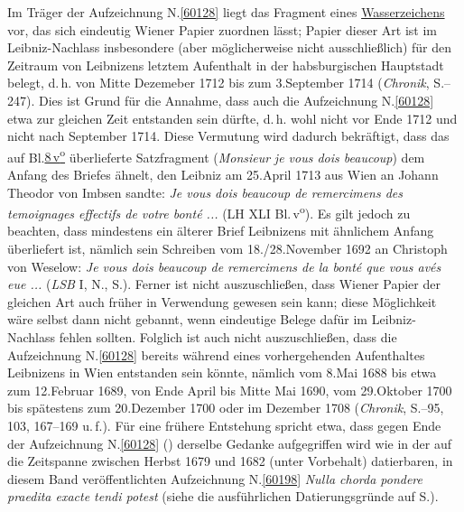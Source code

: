 \pend%
\pstart%
Im Träger der Aufzeichnung N.\;\ref{60128} liegt das Fragment eines \href{\Scan{LH_35_10_16_008wz}}{Wasserzeichens} vor, das sich eindeutig Wiener Papier zuordnen lässt;
Papier dieser Art ist im Leibniz-Nachlass insbesondere (aber möglicherweise nicht ausschließlich) für den Zeitraum von Leibnizens letztem Aufenthalt in der habsburgischen Hauptstadt belegt, d.\,h. von Mitte Dezemeber 1712 bis zum 3.\;September 1714 (\textit{Chronik}, S.--247).\cite{01236}
Dies ist Grund für die Annahme, dass auch die Aufzeichnung N.\;\ref{60128} etwa zur gleichen Zeit entstanden sein dürfte, d.\,h. wohl nicht vor Ende 1712 und nicht nach September 1714.
Diese Vermutung wird dadurch bekräftigt, dass das auf Bl.\;\href{\Scan{LH_35_10_16_008v}}{8\,v\textsuperscript{o}} überlieferte Satzfragment (\textit{Monsieur} \bracks{/} \textit{je vous dois beaucoup}) dem Anfang des Briefes ähnelt, den Leibniz am 25.\;April 1713 aus Wien an Johann Theodor von Imbsen sandte: \textit{Je vous dois beaucoup de remercimens des temoignages effectifs de votre bonté ...} (LH XLI Bl.\,v\textsuperscript{o}).\cite{02537}
\pend%
\pstart%
Es gilt jedoch zu beachten, dass mindestens ein älterer Brief Leibnizens mit ähnlichem Anfang überliefert ist, nämlich sein Schreiben vom 18./28.\;November 1692 an Christoph von Weselow: \textit{Je vous dois beaucoup de remercimens de la bonté que vous avés eue ...} (\textit{LSB} I, N., S.).\cite{02538}
Ferner ist nicht auszuschließen, dass Wiener Papier der gleichen Art auch früher in Verwendung gewesen sein kann;
diese Möglichkeit wäre selbst dann nicht gebannt, wenn eindeutige Belege dafür im Leibniz-Nachlass fehlen sollten.
Folglich ist auch nicht auszuschließen, dass die Aufzeichnung N.\;\ref{60128} bereits während eines vorhergehenden Aufenthaltes Leibnizens in Wien entstanden sein könnte, nämlich %
vom 8.\;Mai 1688 bis etwa zum 12.\;Februar 1689,
von Ende April bis Mitte Mai 1690,
vom 29.\;Oktober 1700 bis spätestens zum 20.\;Dezember 1700
oder
im Dezember 1708 (\textit{Chronik}, S.--95, 103, 167--169 u.\,f.).\cite{01236}
\pend%
\pstart%
Für eine frühere Entstehung spricht etwa, dass gegen Ende der Aufzeichnung N.\;\ref{60128} () derselbe Gedanke aufgegriffen wird wie in der auf die Zeitspanne zwischen Herbst 1679 und 1682 (unter Vorbehalt) datierbaren, in diesem Band veröffentlichten Aufzeichnung N.\;\ref{60198} \textit{Nulla chorda pondere praedita exacte tendi potest} (siehe die ausführlichen Datierungsgründe auf S.\;\pageref{60198_dat}).
